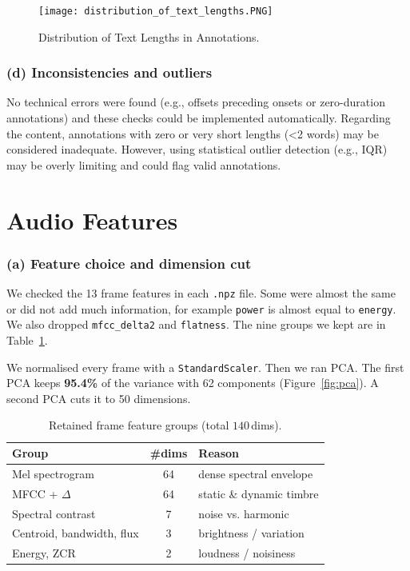 \documentclass[runningheads]{llncs}
\begin{document}
\begin{figure}[h]
    \centering
    \texttt{[image: distribution\_of\_text\_lengths.PNG]}
    \caption{Distribution of Text Lengths in Annotations.}
    \label{fig:len}
\end{figure}

\subsubsection{(d) Inconsistencies and outliers}
No technical errors were found (e.g., offsets preceding onsets or zero-duration annotations) and these checks could be implemented automatically.
Regarding the content, annotations with zero or very short lengths (<2 words) may be considered inadequate. However, using statistical outlier detection (e.g., IQR) may be overly limiting and could flag valid annotations.




\section{Audio Features}

\subsubsection{(a) Feature choice and dimension cut}
We checked the 13 frame features in each \texttt{.npz} file. Some were almost the same or did not add much information, for example \texttt{power} is almost equal to \texttt{energy}. We also dropped \texttt{mfcc\_delta2} and \texttt{flatness}. The nine groups we kept are in Table~\ref{tab:feat}.

We normalised every frame with a \texttt{StandardScaler}. Then we ran PCA. The first PCA keeps \textbf{95.4\%} of the variance with 62 components (Figure~\ref{fig:pca}). A second PCA cuts it to 50 dimensions.

\begin{table}[h]
    \caption{Retained frame feature groups (total $140$\,dims).}
    \label{tab:feat}
    \centering
    \begin{tabular}{lcl}
        \toprule
        Group & \#dims & Reason \\ \midrule
        Mel spectrogram            & 64 & dense spectral envelope \\
        MFCC + $\Delta$            & 64 & static \& dynamic timbre \\
        Spectral contrast          & 7  & noise vs. harmonic      \\
        Centroid, bandwidth, flux  & 3  & brightness / variation   \\
        Energy, ZCR                & 2  & loudness / noisiness     \\ \bottomrule
    \end{tabular}
\end{table}
\end{document}
